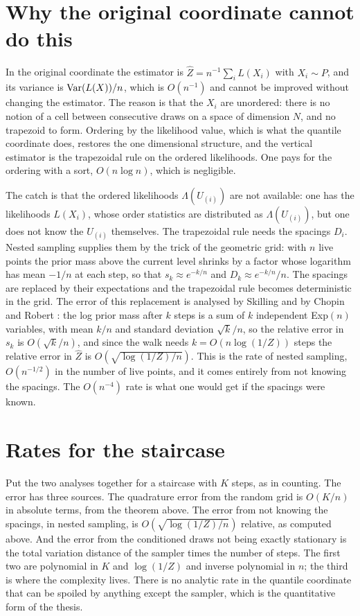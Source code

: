 \section{Why the original coordinate cannot do this}

In the original coordinate the estimator is $\hat Z = n^{-1} \sum_i L(X_i)$ with $X_i \sim P$, and its variance is $\operatorname{Var}(L(X)) / n$, which is $O(n^{-1})$ and cannot be improved without changing the estimator. The reason is that the $X_i$ are unordered: there is no notion of a cell between consecutive draws on a space of dimension $N$, and no trapezoid to form. Ordering by the likelihood value, which is what the quantile coordinate does, restores the one dimensional structure, and the vertical estimator is the trapezoidal rule on the ordered likelihoods. One pays for the ordering with a sort, $O(n \log n)$, which is negligible.

The catch is that the ordered likelihoods $\Lambda(U_{(i)})$ are not available: one has the likelihoods $L(X_i)$, whose order statistics are distributed as $\Lambda(U_{(i)})$, but one does not know the $U_{(i)}$ themselves. The trapezoidal rule needs the spacings $D_i$. Nested sampling supplies them by the trick of the geometric grid: with $n$ live points the prior mass above the current level shrinks by a factor whose logarithm has mean $-1/n$ at each step, so that $s_k \approx e^{-k/n}$ and $D_k \approx e^{-k/n} / n$. The spacings are replaced by their expectations and the trapezoidal rule becomes deterministic in the grid. The error of this replacement is analysed by Skilling \cite{Skilling} and by Chopin and Robert \cite{ChopinRobert}: the log prior mass after $k$ steps is a sum of $k$ independent Exp$(n)$ variables, with mean $k/n$ and standard deviation $\sqrt{k}/n$, so the relative error in $s_k$ is $O(\sqrt{k}/n)$, and since the walk needs $k = O(n \log(1/Z))$ steps the relative error in $\hat Z$ is $O(\sqrt{\log(1/Z) / n})$. This is the rate of nested sampling, $O(n^{-1/2})$ in the number of live points, and it comes entirely from not knowing the spacings. The $O(n^{-4})$ rate is what one would get if the spacings were known.

\section{Rates for the staircase}

Put the two analyses together for a staircase with $K$ steps, as in counting. The error has three sources. The quadrature error from the random grid is $O(K / n)$ in absolute terms, from the theorem above. The error from not knowing the spacings, in nested sampling, is $O(\sqrt{\log(1/Z) / n})$ relative, as computed above. And the error from the conditioned draws not being exactly stationary is the total variation distance of the sampler times the number of steps. The first two are polynomial in $K$ and $\log(1/Z)$ and inverse polynomial in $n$; the third is where the complexity lives. There is no analytic rate in the quantile coordinate that can be spoiled by anything except the sampler, which is the quantitative form of the thesis.

